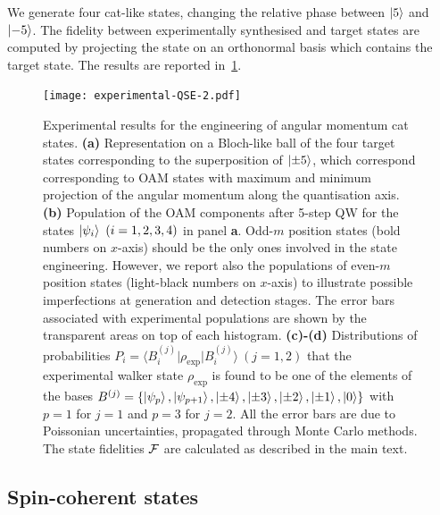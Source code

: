 We generate four cat-like states, changing the relative phase between $\ket5$ and $\ket{-5}$.
The fidelity between experimentally synthesised and target states are computed by projecting the state on an orthonormal basis which contains the target state. The results are reported in~\cref{fig:expQWs:results}.

\begin{figure}[tb]
\texttt{[image: experimental-QSE-2.pdf]}
\caption{
	Experimental results for the engineering of angular momentum cat states.
	\textbf{(a)} Representation on a Bloch-like ball of the four target states corresponding to the superposition of $\ket{\pm 5}$, which correspond corresponding to \ac{OAM} states with maximum and minimum projection of the angular momentum along the quantisation axis.
	\textbf{(b)} Population of the \ac{OAM} components after 5-step {QW} for the states $\ket{\psi_i}~(i=1,2,3,4)$ in panel {\bf a}. Odd-$m$ position states (bold numbers on $x$-axis) should be the only ones involved in the state engineering. However, we report also the populations of even-$m$ position states (light-black numbers on $x$-axis) to illustrate possible imperfections at generation and detection stages. The error bars associated with experimental populations are shown by the transparent areas on top of each histogram.
	\textbf{(c)-(d)} Distributions of probabilities $P_i=\langle B^{(j)}_i\vert\rho_\text{exp}\vert B^{(j)}_i\rangle~(j=1,2)$ that the experimental walker state $\rho_\text{exp}$ is found to be one of the elements of the bases $B^{(j)}=\{\ket{\psi_p},\ket{\psi_{p+1}},\ket{\pm4},\ket{\pm3},\ket{\pm2},\ket{\pm1},\ket{0}\}$ with $p=1$ for $j=1$ and $p=3$ for $j=2$. All the error bars are due to Poissonian uncertainties, propagated through Monte Carlo methods. The state fidelities ${\cal F}$ are calculated as described in the main text.
}
\label{fig:expQWs:results}
\end{figure}

\subsection{Spin-coherent states}
\label{subsec:expQWs:SCSs}

